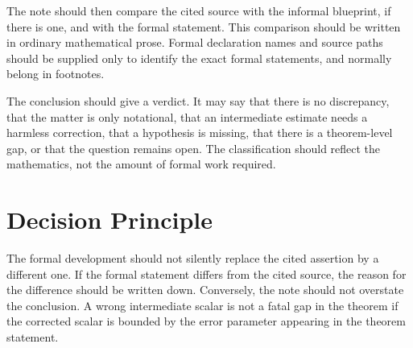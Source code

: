 \documentclass[11pt]{article}
\begin{document}
The note should then compare the cited source with the informal blueprint, if
there is one, and with the formal statement.  This comparison should be written
in ordinary mathematical prose.  Formal declaration names and source paths should
be supplied only to identify the exact formal statements, and normally belong in
footnotes.

The conclusion should give a verdict.  It may say that there is no discrepancy,
that the matter is only notational, that an intermediate estimate needs a
harmless correction, that a hypothesis is missing, that there is a theorem-level
gap, or that the question remains open.  The classification should reflect the
mathematics, not the amount of formal work required.

\section{Decision Principle}

The formal development should not silently replace the cited assertion by a
different one.  If the formal statement differs from the cited source, the
reason for the difference should be written down.  Conversely, the note should
not overstate the conclusion.  A wrong intermediate scalar is not a fatal gap in
the theorem if the corrected scalar is bounded by the error parameter appearing
in the theorem statement.
\end{document}
